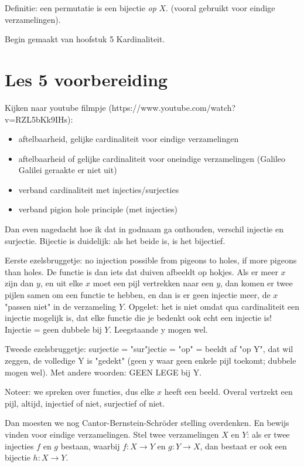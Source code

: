 \documentclass{article}
\begin{document}
Definitie: een permutatie is een bijectie \emph{op} $X$. (vooral gebruikt voor eindige verzamelingen). 

Begin gemaakt van hoofstuk 5 Kardinaliteit. 

\section{Les 5 voorbereiding}

Kijken naar youtube filmpje (https://www.youtube.com/watch?v=RZL5bKk9IHs): 
\begin{itemize}
    \item aftelbaarheid, gelijke cardinaliteit voor eindige verzamelingen
    \item aftelbaarheid of gelijke cardinaliteit voor oneindige verzamelingen (Galileo Galilei geraakte er niet uit) 
    \item verband cardinaliteit met injecties/surjecties 
    \item verband pigion hole principle (met injecties) 
\end{itemize}

Dan even nagedacht hoe ik dat in godnaam ga onthouden, verschil injectie en surjectie. Bijectie is duidelijk: als het beide is, is het bijectief. 

Eerste ezelsbruggetje: no injection possible from pigeons to holes, if more pigeons than holes. De functie is dan iets dat duiven afbeeldt op hokjes. Als er meer $x$ zijn dan $y$, en uit elke $x$ moet een pijl vertrekken naar een $y$, dan komen er twee pijlen samen om een functie te hebben, en dan is er geen injectie meer, de $x$ "passen niet" in de verzameling $Y$. Opgelet: het is niet omdat qua cardinaliteit een injectie mogelijk is, dat elke functie die je bedenkt ook echt een injectie is! 
Injectie = geen dubbele bij $Y$. Leegstaande y mogen wel. 

Tweede ezelsbruggetje: surjectie = "sur"jectie = "op" = beeldt af "op Y", dat wil zeggen, de volledige Y is "gedekt" (geen y waar geen enkele pijl toekomt; dubbele mogen wel). Met andere woorden: GEEN LEGE bij Y. 

Noteer: we spreken over functies, dus elke $x$ heeft een beeld. Overal vertrekt een pijl, altijd, injectief of niet, surjectief of niet. 

Dan moesten we nog Cantor-Bernstein-Schr\"oder stelling overdenken. En bewijs vinden voor eindige verzamelingen. Stel twee verzamelingen $X$ en $Y$: als er twee injecties $f$ en $g$ bestaan, waarbij $f:X \rightarrow Y$ en $g:Y \rightarrow X$, dan bestaat er ook een bijectie $h: X \rightarrow Y$. 
\end{document}

